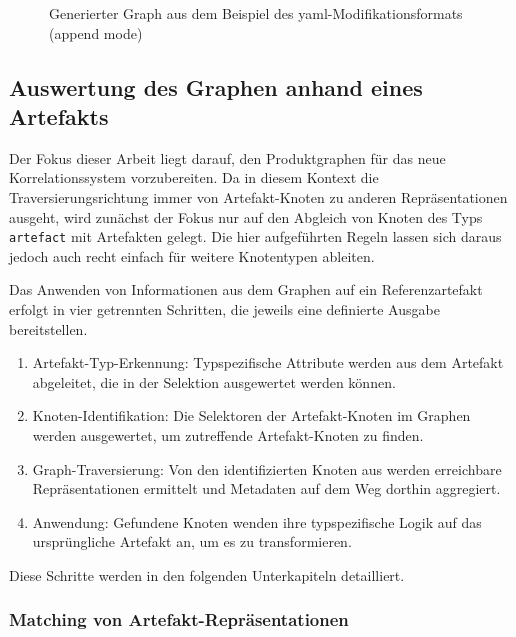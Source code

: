 \begin{figure}[htbp]
    \centering
    \makebox[\textwidth]{}
    \caption{Generierter Graph aus dem Beispiel des \acrshort{yaml}-Modifikationsformats (append mode)}
    \label{fig:modell-graph-modification-yaml-demo-append-rendered}
\end{figure}

\subsection{Auswertung des Graphen anhand eines Artefakts}\label{subsec:model-apply-to-artifact}

Der Fokus dieser Arbeit liegt darauf, den Produktgraphen für das neue Korrelationssystem vorzubereiten.
Da in diesem Kontext die Traversierungsrichtung immer von Artefakt-Knoten zu anderen Repräsentationen ausgeht, wird zunächst der Fokus nur auf den Abgleich von Knoten des Typs \texttt{artefact} mit Artefakten gelegt.
Die hier aufgeführten Regeln lassen sich daraus jedoch auch recht einfach für weitere Knotentypen ableiten.

Das Anwenden von Informationen aus dem Graphen auf ein Referenzartefakt erfolgt in vier getrennten Schritten, die jeweils eine definierte Ausgabe bereitstellen.

\begin{enumerate}
    \itemsep0em
    \item Artefakt-Typ-Erkennung: Typspezifische Attribute werden aus dem Artefakt abgeleitet, die in der Selektion ausgewertet werden können.
    \item Knoten-Identifikation: Die Selektoren der Artefakt-Knoten im Graphen werden ausgewertet, um zutreffende Artefakt-Knoten zu finden.
    \item Graph-Traversierung: Von den identifizierten Knoten aus werden erreichbare Repräsentationen ermittelt und Metadaten auf dem Weg dorthin aggregiert.
    \item Anwendung: Gefundene Knoten wenden ihre typspezifische Logik auf das ursprüngliche Artefakt an, um es zu transformieren.
\end{enumerate}

Diese Schritte werden in den folgenden Unterkapiteln detailliert.

\subsubsection{Matching von Artefakt-Repräsentationen}\label{subsubsec:model-matching}

